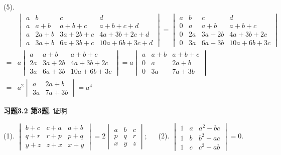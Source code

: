 (5). 
\begin{align*}
& \begin{vmatrix} a & b & c & d \\ a & a+b & a+b+c & a+b+c+d \\ a & 2a+b & 3a+2b+c & 4a+3b+2c+d \\ a & 3a+b & 6a+3b+c & 10a+6b+3c+d \end{vmatrix} = \begin{vmatrix} a & b & c & d \\ 0 & a & a+b & a+b+c \\ 0 & 2a & 3a+2b & 4a+3b+2c \\ 0 & 3a & 6a+3b & 10a+6b+3c \end{vmatrix} \\
= & a \begin{vmatrix} a & a+b & a+b+c \\ 2a & 3a+2b & 4a+3b+2c \\ 3a & 6a+3b & 10a+6b+3c \end{vmatrix} = a \begin{vmatrix} a & a+b & a+b+c \\ 0 & a & 2a+b \\ 0 & 3a & 7a+3b \end{vmatrix} \\
= & a^2 \begin{vmatrix} a & 2a+b \\ 3a & 7a+3b \end{vmatrix} = a^4
\end{align*}

\newpageorvspace

{\bf 习题3.2 第3题}. 证明

(1). $\begin{vmatrix} b+c & c+a & a+b \\ q+r & r+p & p+q \\ y+z & z+x & x+y \end{vmatrix} = 2 \begin{vmatrix} a & b & c \\ p & q & r \\ x & y & z \end{vmatrix}$; $\quad$ (2). $\begin{vmatrix} 1 & a & a^2-bc \\ 1 & b & b^2-ac \\ 1 & c & c^2-ab \end{vmatrix} = 0$.

